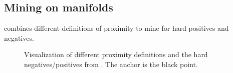 \subsection{Mining on manifolds}\label{subsec:mining_manifolds}

\citet{mining_manifolds_2018} combines different definitions of proximity to mine 
for hard positives and negatives.


\begin{figure}[h]%
    \centering
    \qquad
    \qquad
    \qquad

    \caption{Visualization of different proximity definitions and 
    the hard negatives/positives from \citet{mining_manifolds_2018}.
    The anchor is the black point.}%
    \label{fig:mining_manifolds_vis}%
\end{figure}